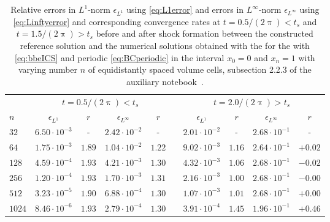 \begin{table}[t]
	\centering
	\caption{\label{tab:BBEconvergence}
		Relative errors in $L^1$-norm $\epsilon_{L^1}$ using \cref{eq:L1error} and errors in $L^\infty$-norm  $\epsilon_{L^\infty}$ using \cref{eq:Linftyerror} and corresponding convergence rates at $t=0.5/(2\uppi)<t_s$ and $t=1.5/(2\uppi)>t_s$ \dash{} before and after shock formation \dash{} between the constructed reference solution and the numerical solutions obtained with the \ktScheme{} for the \bbeq{} with \ic{} \eqref{eq:bbeICS} and periodic \bc{} \eqref{eq:BCperiodic} in the interval $x_0=0$ and $x_{n}=1$ with varying number $n$ of equidistantly spaced volume cells, \cf{} subsection 2.2.3 of the auxiliary notebook~\cite{Steil:2023PhDFVNB}.
	}
	\vspace{\TableAbovecaptionskip}
	\renewcommand{\arraystretch}{1.15}
	\small
	\begin{tabular}{l c c c c  p{0.2em}  c c c c}
		\toprule
		&	\multicolumn{4}{c}{$t=0.5/(2\uppi)<t_s$}							&						&	\multicolumn{4}{c}{$t=2.0/(2\uppi)>t_s$}
		\\\cmidrule(lr){2-5}	\cmidrule(lr){7-10}
		$n$		&	$\epsilon_{L^1}$	&	$r$	&	$\epsilon_{L^\infty}$	&	$r$	&	&$\epsilon_{L^1}$	&	$r$	&	$\epsilon_{L^\infty}$	&	$r$	
		\\
		\midrule\addlinespace[0.25em]
			$32$	&	$6.50\cdot 10^{-3}$	&	-	&	$2.42\cdot 10^{-2}$	&	-	&		&	$2.01\cdot 10^{-2}$	&	-	&	$2.68\cdot 10^{-1}$	&	-\\
			$64$	&	$1.75\cdot 10^{-3}$	&	$1.89$	&	$1.04\cdot 10^{-2}$	&	$1.22$	&		&	$9.02\cdot 10^{-3}$	&	$1.16$	&	$2.64\cdot 10^{-1}$	&	$+0.02$\\
			$128$	&	$4.59\cdot 10^{-4}$	&	$1.93$	&	$4.21\cdot 10^{-3}$	&	$1.30$	&		&	$4.32\cdot 10^{-3}$	&	$1.06$	&	$2.68\cdot 10^{-1}$	&	$-0.02$\\
			$256$	&	$1.20\cdot 10^{-4}$	&	$1.93$	&	$1.70\cdot 10^{-3}$	&	$1.31$	&		&	$2.16\cdot 10^{-3}$	&	$1.00$	&	$2.68\cdot 10^{-1}$	&	$-0.00$\\
			$512$	&	$3.23\cdot 10^{-5}$	&	$1.90$	&	$6.88\cdot 10^{-4}$	&	$1.30$	&		&	$1.07\cdot 10^{-3}$	&	$1.01$	&	$2.68\cdot 10^{-1}$	&	$+0.00$\\
			$1024$	&	$8.46\cdot 10^{-6}$	&	$1.93$	&	$2.79\cdot 10^{-4}$	&	$1.30$	&		&	$3.91\cdot 10^{-4}$	&	$1.45$	&	$1.96\cdot 10^{-1}$	&	$+0.46$\\
		\bottomrule
	\end{tabular}
\end{table}

